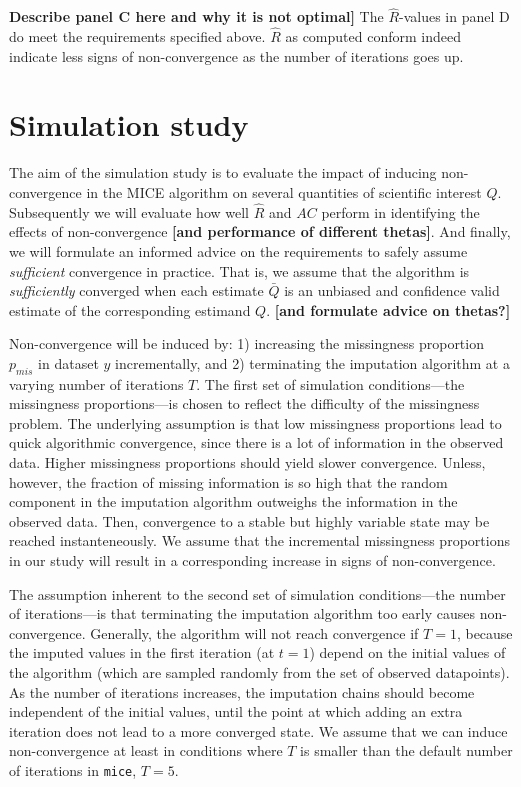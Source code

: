 \documentclass[Royal,times,sageh]{sagej}
\begin{document}
\textbf{Describe panel C here and why it is not optimal{]}} The
\(\widehat{R}\)-values in panel D do meet the requirements specified
above. \(\widehat{R}\) as computed conform \citet{veht19} indeed
indicate less signs of non-convergence as the number of iterations goes
up.

\hypertarget{simulation-study}{%
\section{Simulation study}\label{simulation-study}}

The aim of the simulation study is to evaluate the impact of inducing
non-convergence in the MICE algorithm on several quantities of
scientific interest \(Q\). Subsequently we will evaluate how well
\(\widehat{R}\) and \(AC\) perform in identifying the effects of
non-convergence \textbf{{[}and performance of different thetas{]}}. And
finally, we will formulate an informed advice on the requirements to
safely assume \emph{sufficient} convergence in practice. That is, we
assume that the algorithm is \emph{sufficiently} converged when each
estimate \(\bar{Q}\) is an unbiased and confidence valid estimate of the
corresponding estimand \(Q\). \textbf{{[}and formulate advice on
thetas?{]}}

Non-convergence will be induced by: 1) increasing the missingness
proportion \(p_{mis}\) in dataset \(y\) incrementally, and 2)
terminating the imputation algorithm at a varying number of iterations
\(T\). The first set of simulation conditions---the missingness
proportions---is chosen to reflect the difficulty of the missingness
problem. The underlying assumption is that low missingness proportions
lead to quick algorithmic convergence, since there is a lot of
information in the observed data. Higher missingness proportions should
yield slower convergence. Unless, however, the fraction of missing
information is so high that the random component in the imputation
algorithm outweighs the information in the observed data. Then,
convergence to a stable but highly variable state may be reached
instanteneously. We assume that the incremental missingness proportions
in our study will result in a corresponding increase in signs of
non-convergence.

The assumption inherent to the second set of simulation conditions---the
number of iterations---is that terminating the imputation algorithm too
early causes non-convergence. Generally, the algorithm will not reach
convergence if \(T=1\), because the imputed values in the first
iteration (at \(t=1\)) depend on the initial values of the algorithm
(which are sampled randomly from the set of observed datapoints). As the
number of iterations increases, the imputation chains should become
independent of the initial values, until the point at which adding an
extra iteration does not lead to a more converged state. We assume that
we can induce non-convergence at least in conditions where \(T\) is
smaller than the default number of iterations in \texttt{mice}, \(T=5\).
\end{document}
